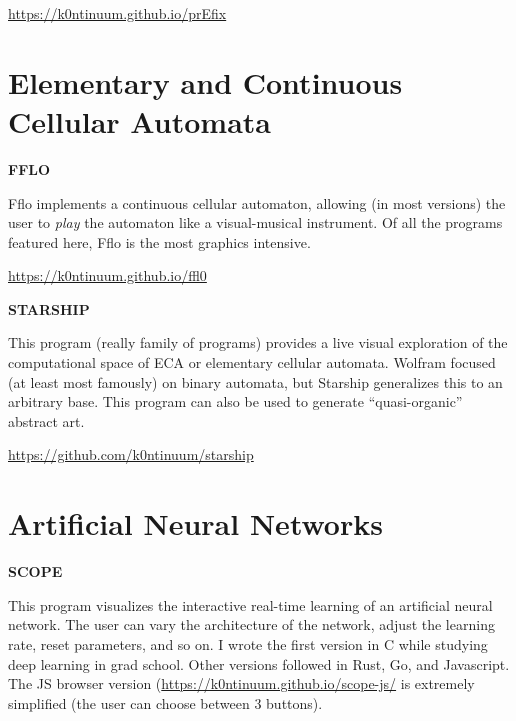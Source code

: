 \documentclass{article}
\renewcommand{\i}{\textit}
\renewcommand{\b}{\textbf}
\newcommand{\q}{\enquote}
\begin{document}
{{\url{https://k0ntinuum.github.io/prEfix}


\section*{Elementary and Continuous Cellular Automata}
  
\b{FFLO}

Fflo implements a continuous cellular automaton, allowing (in most versions) the user to \i{play} the automaton like a visual-musical instrument. Of all the programs featured here, Fflo is the most graphics intensive.


\url{https://k0ntinuum.github.io/ffl0}


\b{STARSHIP}

This program (really family of programs) provides a live visual exploration of the computational space of ECA or elementary cellular automata. Wolfram focused (at least most famously) on binary automata, but Starship generalizes this to an arbitrary base. This program can also be used to generate \q{quasi-organic} abstract art.

\url{https://github.com/k0ntinuum/starship}


\section*{Artificial Neural Networks}

\b{SCOPE}

This program visualizes the interactive real-time learning of an artificial neural network. The user can vary the architecture of the network, adjust the learning rate, reset parameters, and so on.  I wrote the first version in C while studying deep learning in grad school. Other versions followed in Rust, Go, and Javascript. The JS browser version (\url{https://k0ntinuum.github.io/scope-js/} is extremely simplified (the user can choose between $3$ buttons). 




}}
\end{document}
